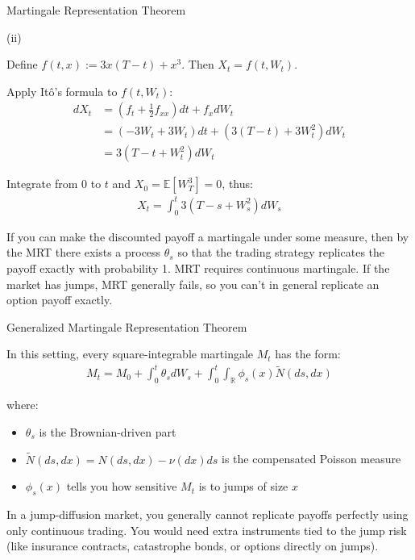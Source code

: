 \documentclass{beamer}
\begin{document}
\begin{frame}{Martingale Representation Theorem}

    {\footnotesize \footnotesize
    \par (ii)
    \par \par Define $f(t, x) := 3x(T - t) + x^3$. Then $X_t = f(t, W_t)$.
    \par Apply Itô's formula to $f(t, W_t)$:
    \begin{align*}
        dX_t &= \left( f_t + \frac{1}{2} f_{xx} \right) dt + f_x dW_t \\
    &= \left( -3W_t + 3W_t \right) dt + \left( 3(T - t) + 3W_t^2 \right) dW_t \\
    &= 3 \left( T - t + W_t^2 \right) dW_t
    \end{align*}
    \par \pause  Integrate from $0$ to $t$ and $X_0 = \mathbb{E}[W_T^3] = 0$, thus:
    \begin{align*}
        X_t = \int_0^t 3 \left( T - s + W_s^2 \right) dW_s
    \end{align*}
    \par  \pause If you can make the discounted payoff a martingale under some measure, then by the MRT 
    there exists a process $\theta_s$ so that the trading strategy replicates the payoff exactly with probability 1.
    MRT requires continuous martingale. If the market has jumps, MRT generally fails, 
    so you can't in general replicate an option payoff exactly.
    }

\end{frame} 


\begin{frame}{Generalized Martingale Representation Theorem}

    {\footnotesize \footnotesize
    \par In this setting, every square-integrable martingale $M_t$ has the form:
    \begin{align*}
        M_t = M_0 + \int_0^t \theta_s dW_s + \int_0^t \int_{\mathbb{R}} \phi_s(x) \tilde{N}(ds, dx)
    \end{align*}
    \par  where:
    \begin{itemize}
        \item $\theta_s$ is the Brownian-driven part
        \item $\tilde{N}(ds, dx) = N(ds, dx) - \nu(dx) ds$ is the compensated Poisson measure
        \item $\phi_s(x)$ tells you how sensitive $M_t$ is to jumps of size $x$
    \end{itemize}
    \par  \pause In a jump-diffusion market, you generally cannot replicate payoffs perfectly using only continuous trading. 
    You would need extra instruments tied to the jump risk (like insurance contracts, catastrophe bonds, or options directly on jumps).
    }

\end{frame} 
\end{document}
